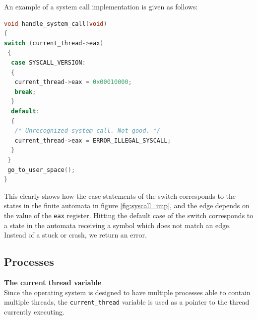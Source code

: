 An example of a system call implementation is given as follows:

\begin{lstlisting}[language=c, caption=System call example]
void handle_system_call(void)
{
switch (current_thread->eax)
 {
  case SYSCALL_VERSION:
  {
   current_thread->eax = 0x00010000;
   break;
  }
  default:
  {
   /* Unrecognized system call. Not good. */
   current_thread->eax = ERROR_ILLEGAL_SYSCALL;
  }
 }
 go_to_user_space();
}
\end{lstlisting}

This clearly shows how the case statements of the switch corresponds to the states in the finite automata in figure \ref{fig:syscall_imp}, and the edge depends on the value of the \texttt{eax} register. Hitting the default case of the switch corresponds to a state in the automata receiving a symbol which does not match an edge. Instead of a stuck or crash, we return an error.

\subsection{Processes}
    
    
    
    
    
    
    


\textbf{The current thread variable} \\
Since the operating system is designed to have multiple processes able to contain multiple threads, the \texttt{current\_thread} variable is used as a pointer to the thread currently executing. 

